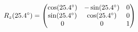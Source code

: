 \documentclass[preview]{standalone}
\begin{document}
\begin{align*}
\special{dvisvgm:raw <g id='unique000'>}R_z(25.4^\circ) = \begin{pmatrix} \cos(25.4^\circ) & -\sin(25.4^\circ) & 0 \\ \sin(25.4^\circ) & \cos(25.4^\circ) & 0 \\ 0 & 0 & 1 \end{pmatrix}\special{dvisvgm:raw </g>}
\end{align*}
\end{document}
